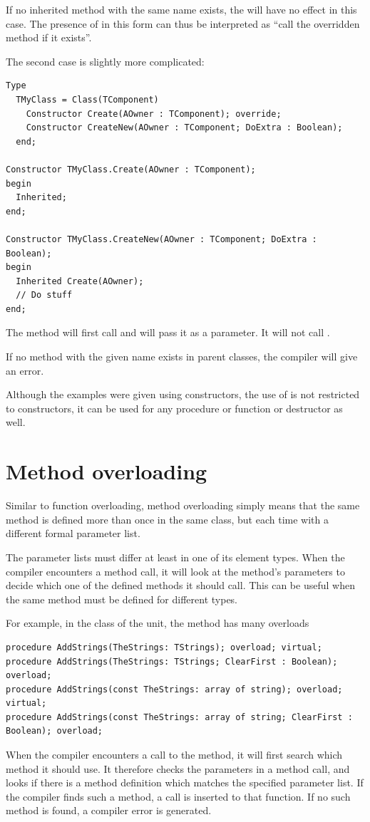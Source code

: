 If no inherited method with the same name exists, the  will have
no effect in this case. The presence of  in this form can thus
be interpreted as ``call the overridden method if it exists''.

The second case is slightly more complicated:
\begin{verbatim}
Type
  TMyClass = Class(TComponent)
    Constructor Create(AOwner : TComponent); override;
    Constructor CreateNew(AOwner : TComponent; DoExtra : Boolean);
  end;

Constructor TMyClass.Create(AOwner : TComponent);
begin
  Inherited;
end;

Constructor TMyClass.CreateNew(AOwner : TComponent; DoExtra : Boolean);
begin
  Inherited Create(AOwner);
  // Do stuff
end;
\end{verbatim}
The  method will first call  and
will pass it  as a parameter. It will not call
.

If no method with the given name exists in parent classes, the compiler will
give an error.

Although the examples were given using constructors, the use of
 is not restricted to constructors, it can be used
for any procedure or function or destructor as well.

\section{Method overloading}
Similar to function overloading, method overloading simply means that the same 
method is defined more than once in the same class, but each time with a different 
formal parameter list.

The parameter lists must differ at least in one of its element types.
When the compiler encounters a method call, it will look at the method's
parameters to decide which one of the defined methods it should call.
This can be useful when the same method must be defined for different
types.

For example, in the  class of the  unit, 
the   method has many overloads
\begin{verbatim}
procedure AddStrings(TheStrings: TStrings); overload; virtual;
procedure AddStrings(TheStrings: TStrings; ClearFirst : Boolean); overload;
procedure AddStrings(const TheStrings: array of string); overload; virtual;
procedure AddStrings(const TheStrings: array of string; ClearFirst : Boolean); overload;
\end{verbatim}
When the compiler encounters a call to the  method, it will first search
which method it should use. It therefore checks the parameters in a
method call, and looks if there is a method definition which matches the
specified parameter list. If the compiler finds such a method, a call is
inserted to that function. If no such method is found, a compiler error is
generated.

